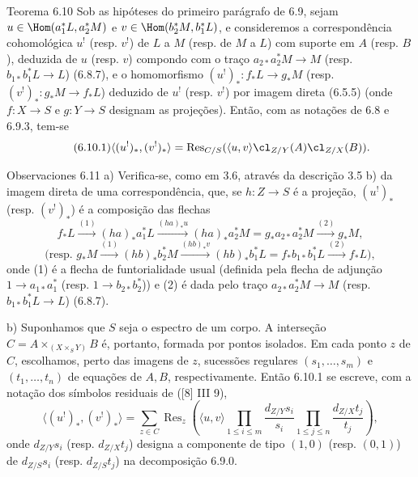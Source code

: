 \begin{statement}{Teorema 6.10}
Sob as hipóteses do primeiro parágrafo de 6.9, sejam $u\in\Hom(a_1^*L,a_2^*M)$ e $v\in\Hom(b_2^*M,b_1^*L)$, e consideremos a correspondência cohomológica $u^!$ (resp. $v^!$) de $L$ a $M$ (resp. de $M$ a $L$) com suporte em $A$ (resp. $B$), deduzida de $u$ (resp. $v$) compondo com o traço $a_{2*}a_2^*M\to M$ (resp. $b_{1*}b_1^*L\to L$) (6.8.7), e o homomorfismo $(u^!)_*:f_*L\to g_*M$ (resp. $(v^!)_*:g_*M\to f_*L$) deduzido de $u^!$ (resp. $v^!$) por imagem direta (6.5.5) (onde $f:X\to S$ e $g:Y\to S$ designam as projeções). Então, com as notações de 6.8 e 6.9.3, tem-se
\begin{equation}
\tag{6.10.1}
\langle (u^!)_*,(v^!)_*\rangle=\operatorname{Res}_{C/S}(\langle u,v\rangle\cl_{Z/Y}(A)\cl_{Z/X}(B)).
\end{equation}
\end{statement}

\begin{statement}{Observaciones 6.11}
a) Verifica-se, como em 3.6, através da descrição 3.5 b) da imagem direta de uma correspondência, que, se $h:Z\to S$ é a projeção, $(u^!)_*$ (resp. $(v^!)_*$) é a composição das flechas
\[
f_*L\xrightarrow{(1)}(ha)_*a_1^*L\xrightarrow{(ha)_*u}(ha)_*a_2^*M=g_*a_{2*}a_2^*M\xrightarrow{(2)}g_*M,
\]
\[
\text{(resp. }g_*M\xrightarrow{(1)}(hb)_*b_2^*M\xrightarrow{(hb)_*v}(hb)_*b_1^*L=f_*b_{1*}b_1^*L\xrightarrow{(2)}f_*L\text{)},
\]
onde (1) é a flecha de funtorialidade usual (definida pela flecha de adjunção $1\to a_{1*}a_1^*$ (resp. $1\to b_{2*}b_2^*$)) e (2) é dada pelo traço $a_{2*}a_2^*M\to M$ (resp. $b_{1*}b_1^*L\to L$) (6.8.7).

b) Suponhamos que $S$ seja o espectro de um corpo. A interseção $C=A\times_{(X\times_S Y)}B$ é, portanto, formada por pontos isolados. Em cada ponto $z$ de $C$, escolhamos, perto das imagens de $z$, sucessões regulares $(s_1,\ldots,s_m)$ e $(t_1,\ldots,t_n)$ de equações de $A,B$, respectivamente. Então 6.10.1 se escreve, com a notação dos símbolos residuais de ([8] III 9),
\begin{equation}
\tag{6.11.1}
\langle (u^!)_*,(v^!)_*\rangle=
\sum_{z\in C}\operatorname{Res}_z\left(\langle u,v\rangle
\prod_{1\le i\le m}\frac{d_{Z/Y}s_i}{s_i}
\prod_{1\le j\le n}\frac{d_{Z/X}t_j}{t_j}\right),
\end{equation}
onde $d_{Z/Y}s_i$ (resp. $d_{Z/X}t_j$) designa a componente de tipo $(1,0)$ (resp. $(0,1)$) de $d_{Z/S}s_i$ (resp. $d_{Z/S}t_j$) na decomposição 6.9.0.
\end{statement}
